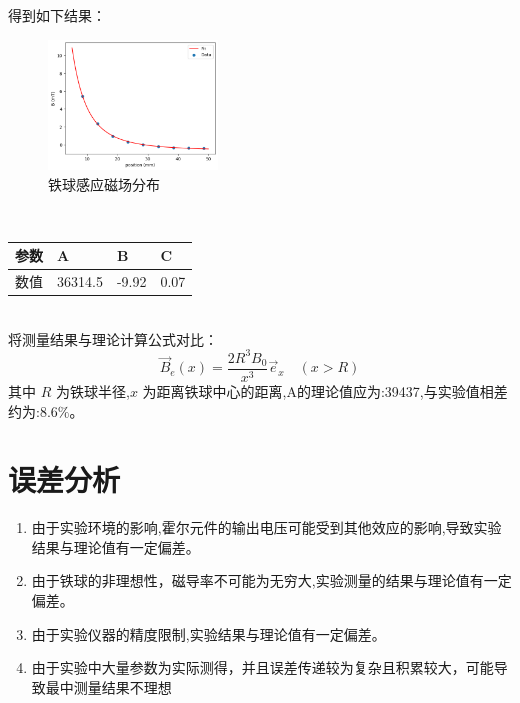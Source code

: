 \documentclass[UTF8]{ctexart}
\begin{document}
    得到如下结果：
    \begin{figure}[htbp]
        \centering
        \includegraphics[width=0.4\textwidth]{B-xball.png}
        \caption{铁球感应磁场分布}
        \label{fig:B-x}
    \end{figure}
\\
    \begin{table}[htbp]
        \centering
        \begin{tabular}{|l|l|l|l|}
            \hline
            参数&A&B&C\\
            \hline
            数值&36314.5&-9.92&0.07\\
            \hline
        \end{tabular}
    \end{table}
    \\
    将测量结果与理论计算公式对比：
    \begin{equation}
    \vec{B}_e(x) = \frac{2R^3 B_0}{x^3}\vec{e}_x \quad (x > R)
    \end{equation}
    其中 $R$ 为铁球半径,$x$ 为距离铁球中心的距离,A的理论值应为:39437,与实验值相差约为:$8.6\%$。
    
    \section{误差分析}
    \begin{enumerate}
        \item 由于实验环境的影响,霍尔元件的输出电压可能受到其他效应的影响,导致实验结果与理论值有一定偏差。
        \item 由于铁球的非理想性，磁导率不可能为无穷大,实验测量的结果与理论值有一定偏差。
        \item 由于实验仪器的精度限制,实验结果与理论值有一定偏差。
        \item 由于实验中大量参数为实际测得，并且误差传递较为复杂且积累较大，可能导致最中测量结果不理想
    \end{enumerate}
    
\end{document}
